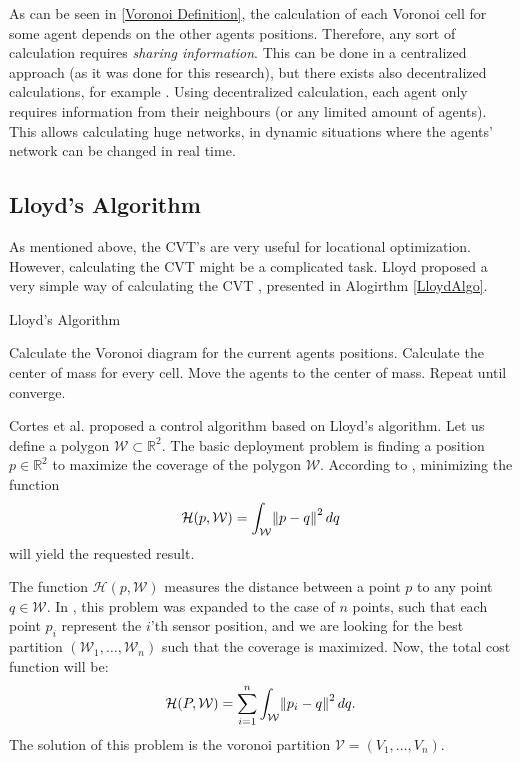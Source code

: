 \documentclass{iacas}
\newcommand{\rsqr}{\mathbb{R}^2}
\begin{document}
As can be seen in \eqref{Voronoi Definition}, the calculation of each Voronoi cell for some agent depends on the other agents positions. Therefore, any sort of calculation requires \emph{sharing information}. This can be done in a centralized approach (as it was done for this research), but there exists also decentralized calculations, for example \cite{Adams2009}. Using decentralized calculation, each agent only requires information from their neighbours (or any limited amount of agents). This allows calculating huge networks, in dynamic situations where the agents' network can be changed in real time.%

\subsection{Lloyd's Algorithm}
As mentioned above, the CVT's are very useful for locational optimization. However, calculating the CVT might be a complicated task. Lloyd proposed a very simple way of calculating the CVT \cite{Lloyd1982}, presented in Alogirthm \ref{LloydAlgo}. 
\begin{algorithm}
\caption{Lloyd's Algorithm}\label{LloydAlgo}
\begin{algorithmic}[1]
\State Calculate the Voronoi diagram for the current agents positions.
\State Calculate the center of mass for every cell.
\State Move the agents to the center of mass.
\State Repeat until converge.
\end{algorithmic}
\label{algo:lloyd's algorithm}
\end{algorithm}

Cortes et al. \cite{Cortes2004} proposed a control algorithm based on Lloyd's algorithm.
Let us define a polygon $\mathcal{W} \subset \rsqr$. The basic deployment problem is finding a position $p \in \rsqr$ to maximize the coverage of the polygon $\mathcal{W}$. According to \cite{Cortes2004}, minimizing the function 
\begin{equation}
\mathcal{H}(p, \mathcal{W}) = \int_{\mathcal{W}} \norm{p-q}^2 dq
\label{eq:Lloyds optimization function}
\end{equation}
will yield the requested result.

The function $\mathcal{H}(p, \mathcal{W})$ measures the distance between a point $p$ to any point $q \in \mathcal{W}$. In \cite{Cortes2004}, this problem was expanded to the case of $n$ points, such that each point $p_i$ represent the $i$'th sensor position, and we are looking for the best partition $(\mathcal{W}_1, \ldots, \mathcal{W}_n)$ such that the coverage is maximized. Now, the total cost function will be:
\begin{equation}
\mathcal{H}(P, \mathcal{W}) = \sum_{i=1}^n \int_{\mathcal{W}} \norm{p_i-q}^2 dq.
\label{eq:vornoi cost function}
\end{equation}
The solution of this problem is the voronoi partition $\mathcal{V} = (V_1, \ldots, V_n)$.
\end{document}
